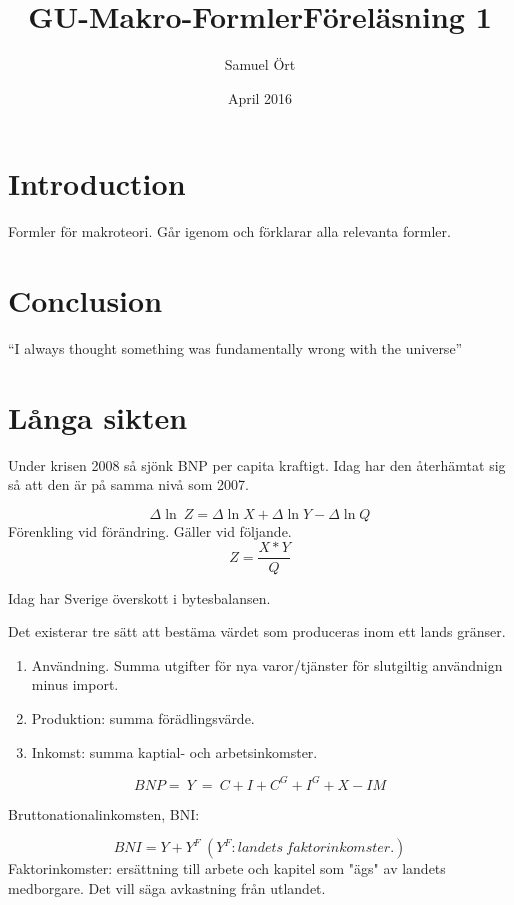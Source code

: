 \documentclass{article}
\title{GU-Makro-Formler}
\author{Samuel Ört}
\date{April 2016}
\begin{document}
\maketitle

\section{Introduction}
Formler för makroteori. Går igenom och förklarar alla relevanta formler. 



\section{Conclusion}
``I always thought something was fundamentally wrong with the universe'' \citep{adams1995hitchhiker}

\section{Långa sikten}
\title{Föreläsning 1}

Under krisen 2008 så sjönk BNP per capita kraftigt. Idag har den återhämtat sig så att den är på samma nivå som 2007. 

$$
    \Delta \ln \ Z = \Delta \ln  X + \Delta \ln Y - \Delta \ln Q
$$
Förenkling vid förändring. Gäller vid följande. 
$$
Z = \frac{X*Y}{Q}
$$

Idag har Sverige överskott i bytesbalansen. 

Det existerar tre sätt att bestäma värdet som produceras inom ett lands gränser. 

\begin{enumerate}
    \item Användning. Summa utgifter för nya varor/tjänster för slutgiltig användnign minus import. 
    \item Produktion: summa förädlingsvärde.
    \item Inkomst: summa kaptial- och arbetsinkomster. 
\end{enumerate}

\begin{equation}
    BNP = \ Y\ = \ C + I + C^G + I^G + X - IM 
\end{equation}

Bruttonationalinkomsten, BNI: 

$$
BNI = Y + Y^F \ (Y^F: landets \ faktorinkomster.) 
$$
Faktorinkomster: ersättning till arbete och kapitel som "ägs" av landets medborgare. Det vill säga avkastning från utlandet. 
\end{document}
